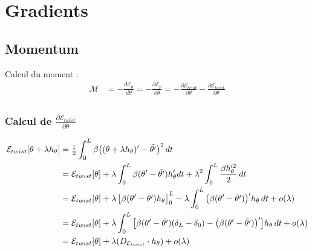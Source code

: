 \section{Gradients}


\subsection{Momentum}

Calcul du moment :
\begin{align}
	\mathcal{M} & = -\frac{d\mathcal{E}_p}{d\theta} =  - \frac{\partial \mathcal{E}_p}{\partial \theta} = - \frac{\partial \mathcal{E}_{bend}}{\partial \theta} - \frac{\partial \mathcal{E}_{twist}}{\partial \theta} \\[0.5em]
\end{align}


\subsubsection{Calcul de $\frac{\partial \mathcal{E}_{twist}}{\partial \theta}$}

\begin{align}
	\mathcal{E}_{twist}[\theta + \lambda h_{\theta}] & = \tfrac{1}{2} \int_{0}^{L} \beta\big((\theta + \lambda h_{\theta})' -{\bar{\theta'}}\big)^2 \,dt \\ 
   	& = \mathcal{E}_{twist}[\theta] + \lambda\int_{0}^{L} \beta(\theta'-{\bar{\theta'}}) h_{\theta}' dt +   \lambda^2 \int_{0}^{L} \frac{\beta h_{\theta}'^2}{2} \,dt \notag\\
	& = \mathcal{E}_{twist}[\theta] + \lambda\left[\beta(\theta'-{\bar{\theta'}}) h_{\theta}\right]_0^L - \lambda\int_{0}^{L} \big(\beta(\theta'-{\bar{\theta'}})\big)' h_{\theta}  \,dt + o(\lambda) \notag\\
	& = \mathcal{E}_{twist}[\theta] + \lambda\int_{0}^{L} \big[\beta(\theta'-{\bar{\theta'}})(\delta_L-\delta_0) - \big(\beta(\theta'-{\bar{\theta'}})\big)'\big] h_{\theta}  \,dt + o(\lambda) \notag\\
	& = \mathcal{E}_{twist}[\theta] + \lambda(D_{\mathcal{E}_{twist}} \cdot h_{\theta}) + o(\lambda) \notag
\end{align}

